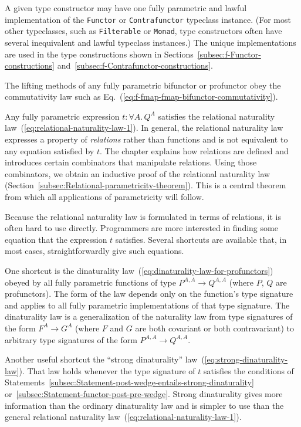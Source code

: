 A given type constructor may have one fully parametric and lawful
implementation of the \lstinline!Functor! or \lstinline!Contrafunctor!
typeclass instance. (For most other typeclasses, such as \lstinline!Filterable!
or \lstinline!Monad!, type constructors often have several inequivalent
and lawful typeclass instances.) The unique implementations are used
in the type constructions shown in Sections~\ref{subsec:f-Functor-constructions}
and~\ref{subsec:f-Contrafunctor-constructions}.

The lifting methods of any fully parametric bifunctor or profunctor
obey the commutativity law such as Eq.~(\ref{eq:f-fmap-fmap-bifunctor-commutativity}). 

Any fully parametric expression $t:\forall A.\,Q^{A}$ satisfies the
relational naturality law~(\ref{eq:relational-naturality-law-1}).
In general, the relational naturality law expresses a property of
\emph{relations} rather than functions and is not equivalent to any
equation satisfied by $t$. The chapter explains how relations are
defined and introduces certain combinators that manipulate relations.
Using those combinators, we obtain an inductive proof of the relational
naturality law (Section~\ref{subsec:Relational-parametricity-theorem}).
This is a central theorem from which all applications of parametricity
will follow.

Because the relational naturality law is formulated in terms of relations,
it is often hard to use directly. Programmers are more interested
in finding some equation that the expression $t$ satisfies. Several
shortcuts are available that, in most cases, straightforwardly give
such equations.

One shortcut is the dinaturality law~(\ref{eq:dinaturality-law-for-profunctors})
obeyed by all fully parametric functions of type $P^{A,A}\rightarrow Q^{A,A}$
(where $P$, $Q$ are profunctors). The form of the law depends only
on the function\textsf{'}s type signature and applies to all fully parametric
implementations of that type signature. The dinaturality law is a
generalization of the naturality law from type signatures of the form
$F^{A}\rightarrow G^{A}$ (where $F$ and $G$ are both covariant
or both contravariant) to arbitrary type signatures of the form $P^{A,A}\rightarrow Q^{A,A}$.

Another useful shortcut the \textsf{``}strong dinaturality\textsf{''} law~(\ref{eq:strong-dinaturality-law}).
That law holds whenever the type signature of $t$ satisfies the conditions
of Statements~\ref{subsec:Statement-post-wedge-entails-strong-dinaturality}
or~\ref{subsec:Statement-functor-post-pre-wedge}. Strong dinaturality
gives more information than the ordinary dinaturality law and is simpler
to use than the general relational naturality law~(\ref{eq:relational-naturality-law-1}).

